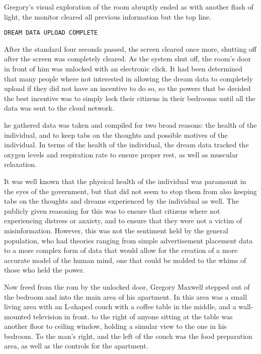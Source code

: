 Gregory’s visual exploration of the room abruptly ended as with another flash of light, the monitor cleared all previous information but the top line.
\begin{center}
\verb|DREAM DATA UPLOAD COMPLETE|
\end{center}
After the standard four seconds passed, the screen cleared once more, shutting off after the screen was completely cleared.
As the system shut off, the room’s door in front of him was unlocked with an electronic click.
It had been determined that many people where not interested in allowing the dream data to completely upload if they did
not have an incentive to do so, so the powers that be decided the best  incentive was to simply lock their citizens in their bedrooms until all the data was sent to the cloud network.

he gathered data was taken and compiled for two broad reasons: the health of the individual, and to keep tabs on the thoughts and possible motives of the individual.
In terms of the health of the individual, the dream data tracked the oxygen levels and respiration rate to ensure proper rest, as well as muscular relaxation.

It was well known that the physical health of the individual was paramount in the eyes of the government, but that did not
seem to stop them from also keeping tabs on the thoughts and dreams experienced by the individual as well.
The publicly given reasoning for this was to ensure that citizens where not experiencing distress or anxiety, and to ensure that they were not a victim of misinformation.
However, this was not the sentiment held by the general population, who had theories ranging from simple advertisement placement data to
a more complex form of data that would allow for the creation of a more accurate model of the human mind, one that could be molded to the whims of those who held the power.

Now freed from the rom by the unlocked door, Gregory Maxwell stepped out of the bedroom and into the main area of his apartment.
In this area was a small living area with an L-shaped couch with a coffee table in the middle, and a wall-mounted television in front.
to the right of anyone sitting at the table was another floor to ceiling window, holding a simular view to the one in his bedroom.
To the man's right, and the left of the couch was the food preparation area, as well as the controls for the apartment.

